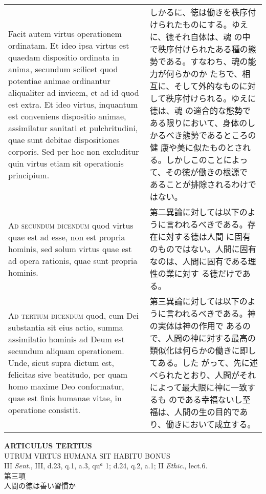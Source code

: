 \documentclass[10pt]{jsarticle}
\begin{document}
\begin{longtable}{p{21em}p{21em}}
Facit autem virtus operationem ordinatam.  Et ideo ipsa virtus est
quaedam dispositio ordinata in anima, secundum scilicet quod potentiae
animae ordinantur aliqualiter ad invicem, et ad id quod est extra. Et
ideo virtus, inquantum est conveniens dispositio animae, assimilatur
sanitati et pulchritudini, quae sunt debitae dispositiones
corporis. Sed per hoc non excluditur quin virtus etiam sit operationis
principium.

&

しかるに、徳は働きを秩序付けられたものにする。ゆえに、徳それ自体は、魂
の中で秩序付けられたある種の態勢である。すなわち、魂の能力が何らかのか
たちで、相互に、そして外的なものに対して秩序付けられる。ゆえに徳は、魂
の適合的な態勢である限りにおいて、身体のしかるべき態勢であるところの健
康や美に似たものとされる。しかしこのことによって、その徳が働きの根源で
あることが排除されるわけではない。

\\



{\scshape Ad secundum dicendum} quod virtus quae est ad esse, non est
propria hominis, sed solum virtus quae est ad opera rationis, quae
sunt propria hominis.

&

第二異論に対しては以下のように言われるべきである。存在に対する徳は人間
に固有のものではない。人間に固有なのは、人間に固有である理性の業に対す
る徳だけである。

\\



{\scshape Ad tertium dicendum} quod, cum Dei substantia sit eius
actio, summa assimilatio hominis ad Deum est secundum aliquam
operationem. Unde, sicut supra dictum est, felicitas sive beatitudo,
per quam homo maxime Deo conformatur, quae est finis humanae vitae, in
operatione consistit.

&

第三異論に対しては以下のように言われるべきである。神の実体は神の作用で
あるので、人間の神に対する最高の類似化は何らかの働きに即してある。した
がって、先に述べられたとおり、人間がそれによって最大限に神に一致するも
のである幸福ないし至福は、人間の生の目的であり、働きにおいて成立する。


\end{longtable}
\newpage


\begin{center}
{\Large {\bf ARTICULUS TERTIUS}}\\
{\large UTRUM VIRTUS HUMANA SIT HABITU BONUS}\\
{\footnotesize III {\itshape Sent.}, III, d.23, q.1, a.3, qu$^{a}$ 1; d.24, q.2, a.1; II {\itshape Ethic}., lect.6.}\\
{\Large 第三項\\人間の徳は善い習慣か}
\end{center}
\end{document}
